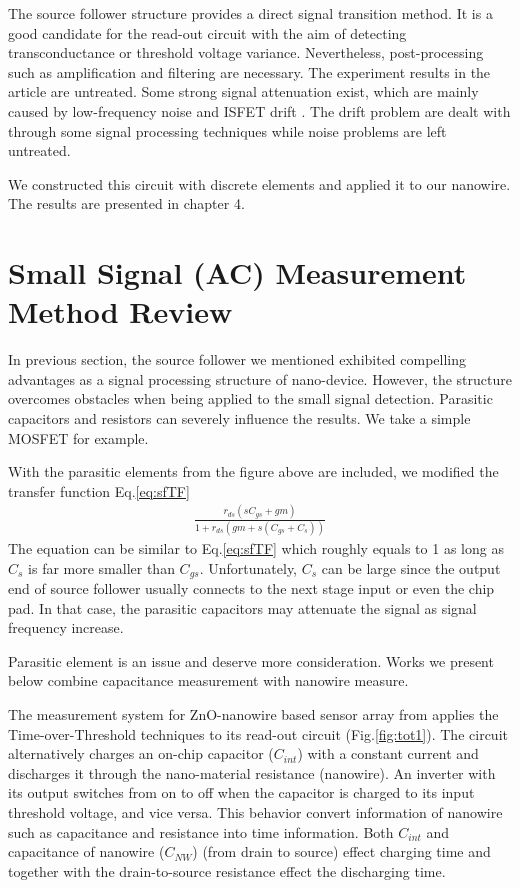 The source follower structure provides a direct signal transition method.
It is a good candidate for the read-out circuit with the aim of detecting transconductance or threshold voltage variance.
Nevertheless, post-processing such as amplification and filtering are necessary.
The experiment results in the article are untreated.
Some strong signal attenuation exist, which are mainly caused by low-frequency noise and ISFET drift \cite{Drift}.
The drift problem are dealt with through some signal processing techniques while noise problems are left untreated.

We constructed this circuit with discrete elements and applied it to our nanowire. The results are presented in chapter 4.


\section{Small Signal (AC) Measurement Method Review}
In previous section, the source follower we mentioned exhibited compelling advantages as a signal processing structure of nano-device.
However, the structure overcomes obstacles when being applied to the small signal detection.
Parasitic capacitors and resistors can severely influence the results.
We take a simple MOSFET for example.

{\color{red}{Fig of parasitic mosfet}}

With the parasitic elements from the figure above are included, we modified the transfer function Eq.\ref{eq:sfTF}
\begin{align}
    \frac{r_{ds}(sC_{gs} + gm)}{1 + r_{ds}(gm + s(C_{gs}+C_s))}
\end{align}
The equation can be similar to Eq.\ref{eq:sfTF} which roughly equals to 1 as long as $C_s$ is far more smaller than $C_{gs}$.
Unfortunately, $C_s$ can be large since the output end of source follower usually connects to the next stage input or even the chip pad.
In that case, the parasitic capacitors may attenuate the signal as signal frequency increase.

Parasitic element is an issue and deserve more consideration.
{\color{red}Works} we present below combine capacitance measurement with nanowire measure.   %


The measurement system for ZnO-nanowire based sensor array from \cite{Juv1} applies the Time-over-Threshold techniques to its read-out circuit (Fig.\ref{fig:tot1}).
The circuit alternatively charges an on-chip capacitor ($C_{int}$) with a constant current and discharges it through the nano-material resistance (nanowire).
An inverter with its output switches from on to off when the capacitor is charged to its input threshold voltage, and vice versa.
This behavior convert information of nanowire such as capacitance and resistance into time information.
Both $C_{int}$ and capacitance of nanowire ($C_{NW}$) (from drain to source) effect charging time and together with the drain-to-source resistance effect the discharging time.

